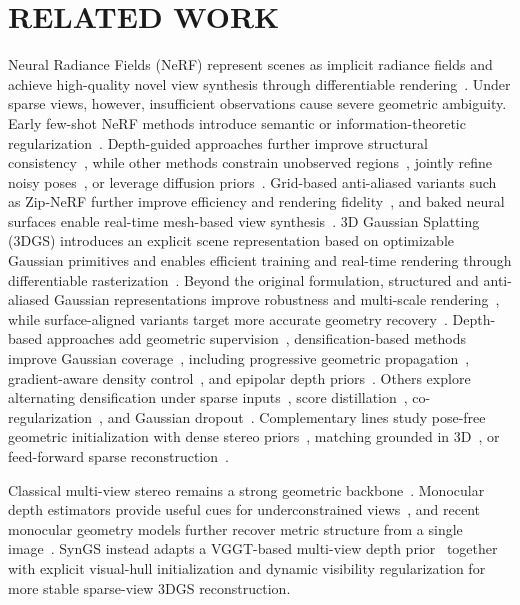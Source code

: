 \section{RELATED WORK}
\label{sec:related}

Neural Radiance Fields (NeRF) represent scenes as implicit radiance fields and achieve high-quality novel view synthesis through differentiable rendering~\cite{Mildenhall21_NeRF}. Under sparse views, however, insufficient observations cause severe geometric ambiguity. Early few-shot NeRF methods introduce semantic or information-theoretic regularization~\cite{Jain21_DietNeRF,Kim22_InfoNeRF}. Depth-guided approaches further improve structural consistency~\cite{Wang23_SparseNeRF,Deng22_DSNeRF}, while other methods constrain unobserved regions~\cite{Niemeyer22_RegNeRF}, jointly refine noisy poses~\cite{Truong23_SPARF}, or leverage diffusion priors~\cite{Wu24_ReconFusion}. Grid-based anti-aliased variants such as Zip-NeRF further improve efficiency and rendering fidelity~\cite{Barron23_ZipNeRF}, and baked neural surfaces enable real-time mesh-based view synthesis~\cite{Yariv23_BakedSDF}.
3D Gaussian Splatting (3DGS) introduces an explicit scene representation based on optimizable Gaussian primitives and enables efficient training and real-time rendering through differentiable rasterization~\cite{Kerbl23_3DGS}. Beyond the original formulation, structured and anti-aliased Gaussian representations improve robustness and multi-scale rendering~\cite{Lu24_ScaffoldGS,Yu24_MipSplatting}, while surface-aligned variants target more accurate geometry recovery~\cite{Guedon24_SuGaR,Huang24_2DGS}. Depth-based approaches add geometric supervision~\cite{Li24_DNGaussian}, densification-based methods improve Gaussian coverage~\cite{Zhu24_FSGS,Bao25_LoopSparseGS}, including progressive geometric propagation~\cite{Cheng24_GaussianPro}, gradient-aware density control~\cite{Zhou26_GDAGS,Zhang24_PixelGS}, and epipolar depth priors~\cite{Zheng25_NexusGS}. Others explore alternating densification under sparse inputs~\cite{Patle25_ADGS}, score distillation~\cite{Xiong24_SparseGS}, co-regularization~\cite{Zhang24_CoRGS}, and Gaussian dropout~\cite{Park25_DropGaussian,Fang26_DropAnSH}. Complementary lines study pose-free geometric initialization with dense stereo priors~\cite{Wang24_DUSt3R,Fan24_InstantSplat}, matching grounded in 3D~\cite{Leroy24_MASt3R}, or feed-forward sparse reconstruction~\cite{Charatan24_pixelSplat,Chen24_MVSplat}.

Classical multi-view stereo remains a strong geometric backbone~\cite{Cao24_MVSFormerPP}. Monocular depth estimators provide useful cues for underconstrained views~\cite{Yang24_DepthAnythingV2,Bochkovskii24_DepthPro}, and recent monocular geometry models further recover metric structure from a single image~\cite{Wang24_MoGe}. SynGS instead adapts a VGGT-based multi-view depth prior~\cite{Wang25_VGGT} together with explicit visual-hull initialization and dynamic visibility regularization for more stable sparse-view 3DGS reconstruction.
